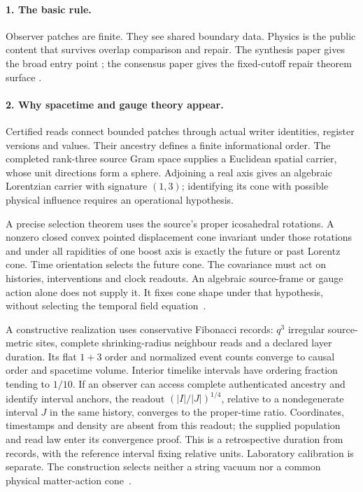\documentclass[11pt]{article}
\theoremstyle{remark}
\theoremstyle{plain}
\begin{document}
\paragraph{1. The basic rule.}
Observer patches are finite. They see shared boundary data. Physics is the public content that
survives overlap comparison and repair. The synthesis paper gives the broad entry point
\cite{OPHObserversAllYouNeed}; the consensus paper gives the fixed-cutoff repair theorem surface
\cite{OPHRealityConsensus}.

\paragraph{2. Why spacetime and gauge theory appear.}
Certified reads connect bounded patches through actual writer identities,
register versions and values. Their ancestry defines a finite informational
order. The completed rank-three source Gram space supplies a Euclidean spatial
carrier, whose unit directions form a sphere. Adjoining a real axis gives an
algebraic Lorentzian carrier with signature $(1,3)$; identifying its cone with
possible physical influence requires an operational hypothesis.

A precise selection theorem uses the source's proper icosahedral rotations.
A nonzero closed convex pointed displacement cone invariant under those
rotations and under all rapidities of one boost axis is exactly the future
or past Lorentz cone. Time orientation selects the future cone. The covariance
must act on histories, interventions and clock readouts. An algebraic
source-frame or gauge action alone does not supply it. It fixes cone shape under that hypothesis, without
selecting the temporal field equation~\cite{ophEinstein}.

A constructive realization uses conservative Fibonacci records: $q^3$
irregular source-metric sites, complete shrinking-radius neighbour reads and
a declared layer duration. Its flat $1+3$ order and normalized event counts
converge to causal order and spacetime volume. Interior timelike intervals
have ordering fraction tending to $1/10$. If an observer can access complete
authenticated ancestry and identify interval anchors, the readout
$(|I|/|J|)^{1/4}$, relative to a nondegenerate interval $J$ in the same history,
converges to the proper-time ratio. Coordinates, timestamps and density are
absent from this readout; the supplied population and read law enter its
convergence proof. This is a retrospective duration from records, with the
reference interval fixing relative units. Laboratory calibration is separate.
The construction selects neither a string vacuum nor a common physical
matter-action cone~\cite{ophEinstein}.
\end{document}
